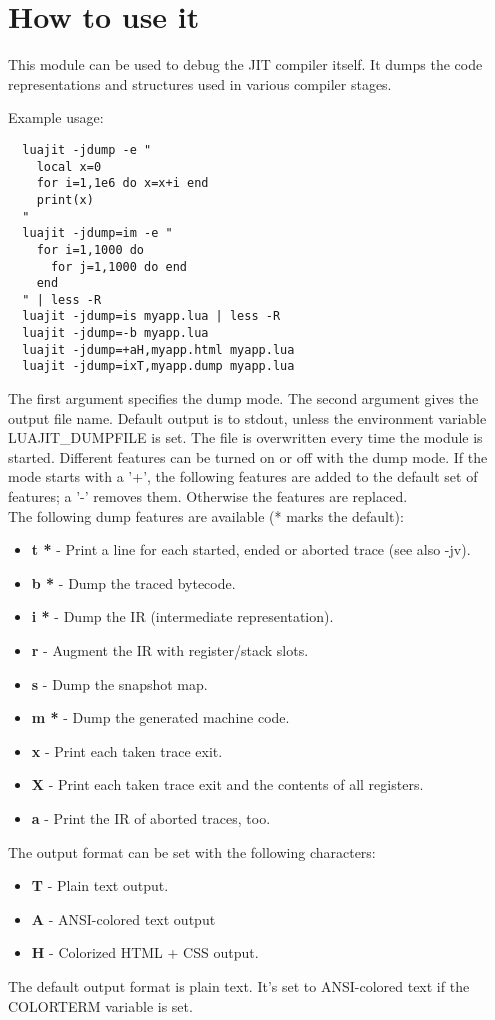 \section{How to use it}
\label{Sec:dump-usage}
This module can be used to debug the JIT compiler itself. It dumps the
code representations and structures used in various compiler stages.

Example usage:
\begin{lstlisting}
  luajit -jdump -e "
    local x=0
    for i=1,1e6 do x=x+i end
    print(x)
  "
  luajit -jdump=im -e "
    for i=1,1000 do
      for j=1,1000 do end
    end
  " | less -R
  luajit -jdump=is myapp.lua | less -R
  luajit -jdump=-b myapp.lua
  luajit -jdump=+aH,myapp.html myapp.lua
  luajit -jdump=ixT,myapp.dump myapp.lua
\end{lstlisting}
The first argument specifies the dump mode. The second argument gives
the output file name. Default output is to stdout, unless the environment
variable LUAJIT\_DUMPFILE is set. The file is overwritten every time the
module is started. Different features can be turned on or off with the dump mode.
If the mode starts with a '+', the following features are added to the default
set of features; a '-' removes them. Otherwise the features are replaced.\\
The following dump features are available (* marks the default):

\begin{itemize}
  \item \textbf{t *} - Print a line for each started, ended or aborted trace (see also -jv).
  \item \textbf{b *} - Dump the traced bytecode.
  \item \textbf{i *} - Dump the IR (intermediate representation).
  \item \textbf{r} - Augment the IR with register/stack slots.
  \item \textbf{s} - Dump the snapshot map.
  \item \textbf{m *} - Dump the generated machine code.
  \item \textbf{x} - Print each taken trace exit.
  \item \textbf{X} - Print each taken trace exit and the contents of all registers.
  \item \textbf{a} - Print the IR of aborted traces, too.
\end{itemize}
The output format can be set with the following characters:
\begin{itemize}
   \item \textbf{T} - Plain text output.
   \item \textbf{A} - ANSI-colored text output
   \item \textbf{H} - Colorized HTML + CSS output.
\end{itemize}
The default output format is plain text. It's set to ANSI-colored text
if the COLORTERM variable is set.

